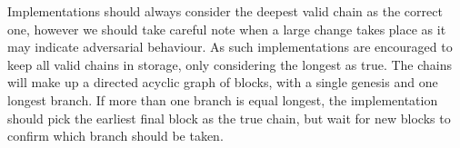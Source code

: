 Implementations should always consider the deepest valid chain as the correct one, however we should take careful note when a large change takes place as it may indicate adversarial behaviour. As such implementations are encouraged to keep all valid chains in storage, only considering the longest as true. The chains will make up a directed acyclic graph of blocks, with a single genesis and one longest branch. If more than one branch is equal longest, the implementation should pick the earliest final block as the true chain, but wait for new blocks to confirm which branch should be taken.
